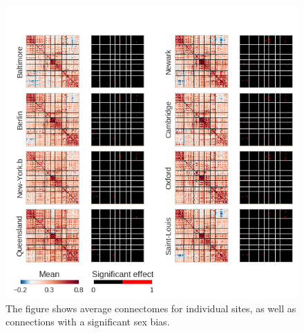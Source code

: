 \documentclass[authoryear]{elsarticle}
\begin{document}
\begin{figure}[htbp]
\begin{center}
\includegraphics[width=\linewidth]{../figures/connectome_multisite2_sex.png}
\end{center}
\caption[Connectome variability across sites]{
The figure shows average connectomes for individual sites, as well as connections with a significant sex bias.
}
\label{fig_connectome_variability_sex}
\end{figure}
\end{document}
